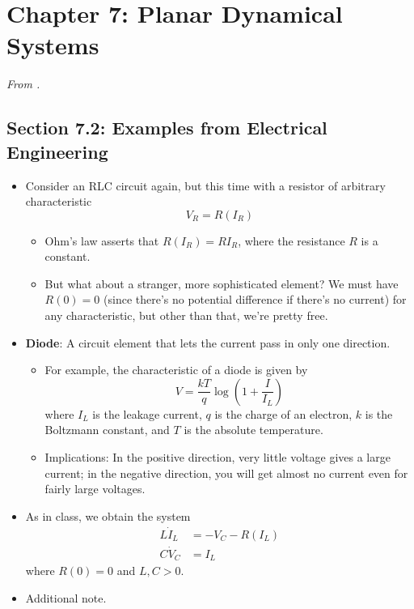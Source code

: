 \documentclass[../notes.tex]{subfiles}
\begin{document}
\section{Chapter 7: Planar Dynamical Systems}
\emph{From \textcite{bib:Teschl}.}
\subsection*{Section 7.2: Examples from Electrical Engineering}
\begin{itemize}
    \item {}Consider an RLC circuit again, but this time with a resistor of arbitrary characteristic
    \begin{equation*}
        V_R = R(I_R)
    \end{equation*}
    \begin{itemize}
        \item Ohm's law asserts that $R(I_R)=RI_R$, where the resistance $R$ is a constant.
        \item But what about a stranger, more sophisticated element? We must have $R(0)=0$ (since there's no potential difference if there's no current) for any characteristic, but other than that, we're pretty free.
    \end{itemize}
    \item \textbf{Diode}: A circuit element that lets the current pass in only one direction.
    \begin{itemize}
        \item For example, the characteristic of a diode is given by
        \begin{equation*}
            V = \frac{kT}{q}\log(1+\frac{I}{I_L})
        \end{equation*}
        where $I_L$ is the leakage current, $q$ is the charge of an electron, $k$ is the Boltzmann constant, and $T$ is the absolute temperature.
        \item Implications: In the positive direction, very little voltage gives a large current; in the negative direction, you will get almost no current even for fairly large voltages.
    \end{itemize}
    \item As in class, we obtain the system
    \begin{align*}
        L\dot{I}_L &= -V_C-R(I_L)\\
        C\dot{V}_C &= I_L
    \end{align*}
    where $R(0)=0$ and $L,C>0$.
    \item Additional note.

\end{itemize}
\end{document}
